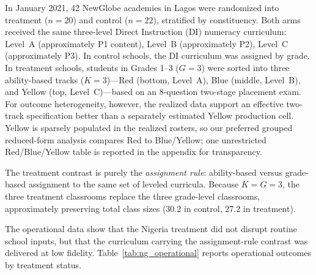 \documentclass[11pt]{article}
\begin{document}
In January 2021, 42 NewGlobe academies in Lagos were randomized into treatment ($n = 20$) and control ($n = 22$), stratified by constituency. Both arms received the same three-level Direct Instruction (DI) numeracy curriculum: Level~A (approximately P1 content), Level~B (approximately P2), Level~C (approximately P3). In control schools, the DI curriculum was assigned by grade. In treatment schools, students in Grades 1--3 ($G = 3$) were sorted into three ability-based tracks ($K = 3$)---Red (bottom, Level~A), Blue (middle, Level~B), and Yellow (top, Level~C)---based on an 8-question two-stage placement exam. For outcome heterogeneity, however, the realized data support an effective two-track specification better than a separately estimated Yellow production cell. Yellow is sparsely populated in the realized rosters, so our preferred grouped reduced-form analysis compares Red to Blue/Yellow; one unrestricted Red/Blue/Yellow table is reported in the appendix for transparency.

The treatment contrast is purely the \emph{assignment rule}: ability-based versus grade-based assignment to the same set of leveled curricula. Because $K = G = 3$, the three treatment classrooms replace the three grade-level classrooms, approximately preserving total class sizes (30.2 in control, 27.2 in treatment).

The operational data show that the Nigeria treatment did not disrupt routine school inputs, but that the curriculum carrying the assignment-rule contrast was delivered at low fidelity. Table~\ref{tab:ng_operational} reports operational outcomes by treatment status.
\end{document}
